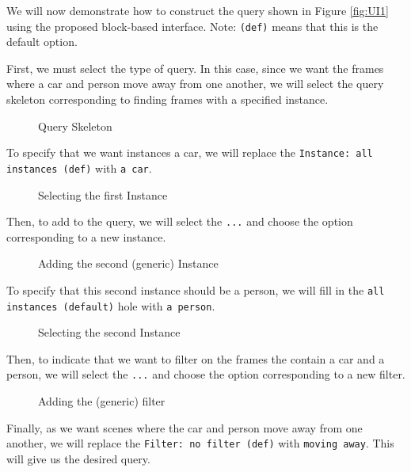 We will now demonstrate how to construct the query shown in Figure \ref{fig:UI1} using the proposed block-based interface. 
Note: \texttt{(def)} means that this is the default option.

First, we must select the type of query. 
In this case, since we want the frames where a car and person move away from one another, we will select the query skeleton corresponding to finding frames with a specified instance.
\begin{figure}[H]
    \caption{Query Skeleton}
    \label{fig:Using1}
\end{figure}
To specify that we want instances a car, we will replace the \texttt{Instance: all instances (def)} with \texttt{a car}.
\begin{figure}[H]
    \caption{Selecting the first Instance}
    \label{fig:Using2}
\end{figure}
Then, to add to the query, we will select the \texttt{...} and choose the option corresponding to a new instance.
\begin{figure}[H]
    \caption{Adding the second (generic) Instance}
    \label{fig:Using3}
\end{figure}
To specify that this second instance should be a person, we will fill in the \texttt{all instances (default)} hole with \texttt{a person}.
\begin{figure}[H]
    \caption{Selecting the second Instance}
    \label{fig:Using4}
\end{figure}
Then, to indicate that we want to filter on the frames the contain a car and a person, we will select the \texttt{...} and choose the option corresponding to a new filter.
\begin{figure}[H]
    \caption{Adding the (generic) filter}
    \label{fig:Using5}
\end{figure}
Finally, as we want scenes where the car and person move away from one another, we will replace the \texttt{Filter: no filter (def)} with \texttt{moving away}. This will give us the desired query.

